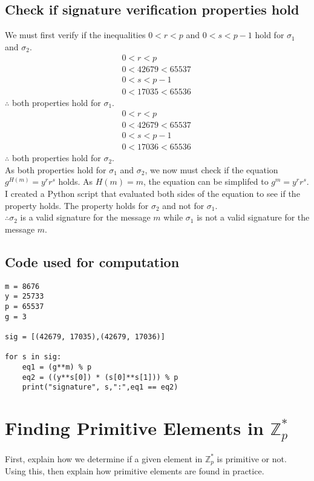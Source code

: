 \documentclass[12pt, letterpaper]{article}
\begin{document}
\begin{itemize}
\subsection{Check if signature verification properties hold}
We must first verify if the inequalities $0<r<p$ and $0<s<p-1$ hold for $\sigma_1$ and $\sigma_2$.
\begin{align*}
&0<r<p \quad \\ 
&0<42679<65537 \quad
\end{align*}
\begin{align*}
&0<s<p-1 \quad \\ 
&0<17035<65536 \quad
\end{align*}
$\therefore$ both properties hold for $\sigma_1$.
\begin{align*}
&0<r<p \quad \\ 
&0<42679<65537 \quad
\end{align*}
\begin{align*}
&0<s<p-1 \quad \\ 
&0<17036<65536 \quad
\end{align*}
$\therefore$ both properties hold for $\sigma_2$.\newline \\
As both properties hold for $\sigma_1$ and $\sigma_2$, we now must check if the equation $g^{H(m)}=y^{r}r^{s}$ holds. As $H(m)= m$, the equation can be simplifed to $g^{m}=y^{r}r^{s}$. I created a Python script that evaluated both sides of the equation to see if the property holds.
The property holds for $\sigma_2$ and not for $\sigma_1$.\newline \\ $\therefore \sigma_2$ is a valid signature for the message $m$ while $\sigma_1$ is not a valid signature for the message $m$.

\subsection{Code used for computation}
\begin{lstlisting}
m = 8676
y = 25733
p = 65537
g = 3

sig = [(42679, 17035),(42679, 17036)]

for s in sig:
    eq1 = (g**m) % p
    eq2 = ((y**s[0]) * (s[0]**s[1])) % p
    print("signature", s,":",eq1 == eq2)
\end{lstlisting}

\end{itemize}

\newpage

\section{Finding Primitive Elements in $\mathbb{Z}_p^*$}

First, explain how we determine if a given element in $\mathbb{Z}_p^*$ is primitive or not. 
Using this, then explain how primitive elements are found in practice. 
\end{document}
